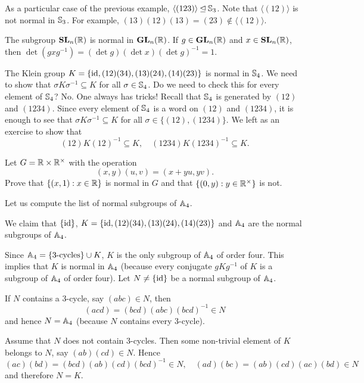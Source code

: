 \begin{example}
As a particular case of the previous example, 
$\langle (123)\rangle\unlhd\mathbb{S}_3$. Note that
$\langle (12)\rangle$ is not normal in $\mathbb{S}_3$.  
For example, $(13)(12)(13)=(23)\not\in\langle(12)\rangle$.
\end{example}

\begin{example}
The subgroup $\mathbf{SL}_n(\mathbb{R})$ is normal in $\mathbf{GL}_n(\mathbb{R})$. If $g\in\mathbf{GL}_n(\mathbb{R})$ and $x\in\mathbf{SL}_n(\mathbb{R})$, then $\det(gxg^{-1})=(\det g)(\det x)(\det g)^{-1}=1$.
\end{example}

\begin{example}
The Klein group $K=\{\operatorname{id},(12)(34),(13)(24),(14)(23)\}$ is normal in
$\mathbb{S}_4$. We need to show that 
$\sigma K\sigma^{-1}\subseteq K$ for all $\sigma\in\mathbb{S}_4$. Do we need to check this for every element of $\mathbb{S}_4$? No. One always has tricks! 
Recall that $\mathbb{S}_4$ is generated by $(12)$ and $(1234)$. Since
every element of  $\mathbb{S}_4$ is a word on $(12)$ and 
$(1234)$,
it is enough to see that
$\sigma K\sigma^{-1}\subseteq K$ for all $\sigma\in\{(12),(1234)\}$. We left as an exercise to show that 
\[
(12)K(12)^{-1}\subseteq K,\quad
(1234)K(1234)^{-1}\subseteq K.
\]
\end{example}

\begin{exercise}
Let $G=\mathbb{R}\times\mathbb{R}^\times$ with the operation 
\[
(x,y)(u,v)=(x+yu,yv).
\]
Prove that $\{(x,1):x\in\mathbb{R}\}$ is normal in $G$ and that
$\{(0,y):y\in\mathbb{R}^\times\}$ is not. 
\end{exercise}

Let us compute the list of normal subgroups of $\mathbb{A}_4$.

\begin{example}
We claim that 
$\{\operatorname{id}\}$, $K=\{\operatorname{id},(12)(34),(13)(24),(14)(23)\}$ and $\mathbb{A}_4$ 
are the normal subgroups of $\mathbb{A}_4$.

Since $\mathbb{A}_4=\{\text{3-cycles}\}\cup K$, $K$ is the only subgroup
of $\mathbb{A}_4$ of order four. This implies that $K$ is normal in $\mathbb{A}_4$ (because every conjugate $gKg^{-1}$ of $K$ is a subgroup of 
$\mathbb{A}_4$ of order four). Let $N\ne\{\operatorname{id}\}$ be a normal subgroup of 
$\mathbb{A}_4$. 

If $N$ contains a 3-cycle, say 
$(abc)\in N$, then 
\[
(acd)=(bcd)(abc)(bcd)^{-1}\in N
\]
and hence $N=\mathbb{A}_4$ (because $N$ contains every 3-cycle). 

Assume that $N$ does not contain 3-cycles. 
Then some non-trivial element of $K$ belongs to $N$, say 
$(ab)(cd)\in N$. Hence 
\[
(ac)(bd)=(bcd)(ab)(cd)(bcd)^{-1}\in N,\quad
(ad)(bc)=(ab)(cd)(ac)(bd)\in N
\]
and therefore $N=K$.
\end{example}

